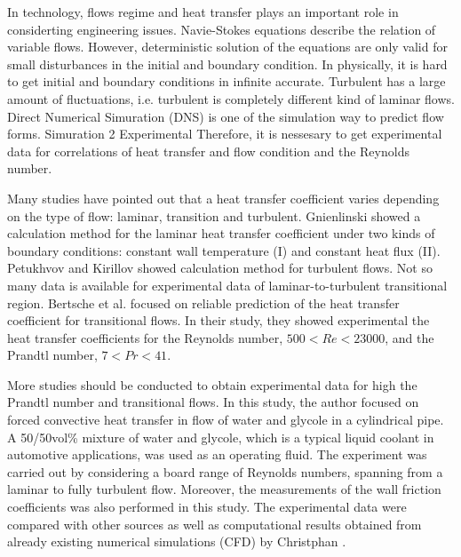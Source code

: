 \documentclass[conference]{IEEEtran}
\begin{document}
In technology, flows regime and heat transfer plays an important role in considerting engineering issues.
Navie-Stokes equations describe the relation of variable flows.
However, deterministic solution of the equations are only valid for small disturbances in the initial and boundary condition.
In physically, it is hard to get initial and boundary conditions in infinite accurate.
Turbulent has a large amount of fluctuations, i.e. turbulent is completely different kind of laminar flows.
Direct Numerical Simuration (DNS) is one of the simulation way to predict flow forms.
Simuration 2 Experimental
Therefore, it is nessesary to get experimental data for correlations of heat transfer and flow condition and the Reynolds number.

Many studies have pointed out that a heat transfer coefficient varies depending on the type of flow: laminar, transition and turbulent.
Gnienlinski\cite{Gnienlinski2010} showed a calculation method for the laminar heat transfer coefficient under two kinds of boundary conditions: constant wall temperature (I) and constant heat flux (I\hspace{-.1em}I).
Petukhvov and Kirillov\cite{Petukhov1958} showed calculation method for turbulent flows.
Not so many data is available for experimental data of laminar-to-turbulent transitional region.
Bertsche et al.\cite{Bertsche2016} focused on reliable prediction of the heat transfer coefficient for transitional flows.
In their study, they showed experimental the heat transfer coefficients for the Reynolds number, $500 < Re < 23000$, and the Prandtl number, $7 < Pr < 41$.

More studies should be conducted to obtain experimental data for high the Prandtl number and transitional flows.
In this study, the author focused on forced convective heat transfer in flow of water and glycole in a cylindrical pipe.
A 50/50vol\% mixture of water and glycole, which is a typical liquid coolant in automotive applications, was used as an operating fluid.
The experiment was carried out by considering a board range of Reynolds numbers, spanning from a laminar to fully turbulent flow.
Moreover, the measurements of the wall friction coefficients was also performed in this study.
The experimental data were compared with other sources as well as computational results obtained from already existing numerical simulations (CFD) by Christphan \cite{Christphan2018}.
\end{document}
